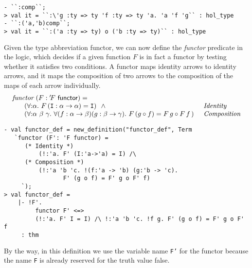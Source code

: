 \begin{session}
\begin{verbatim}
- ``:comp``;
> val it = ``:\'g :ty => ty 'f :ty => ty 'a. 'a 'f 'g`` : hol_type
- ``:('a,'b)comp``;
> val it = ``:('a :ty => ty) o ('b :ty => ty)`` : hol_type
\end{verbatim}
\end{session}

Given the type abbreviation {\sf functor}, we can now define the
{\it functor\/} predicate in the logic, which decides if a given function
$F$ is in fact a functor by testing whether it satisfies two conditions.
A functor maps identity arrows to identity arrows,
and it maps the composition of two arrows to the composition of the maps of each arrow
individually.
$$
 \begin{array}[t]{@{\hspace{8mm}}l@{\hspace{5mm}}l}
   \multicolumn{2}{l}
     {\mbox{\it functor}\ (F : {'\!F}\ \textsf{functor}) =} \\
   (\forall{:}\alpha.\ F\, (\mbox{\tt I}:\alpha \rightarrow \alpha) = \mbox{\tt I}) \ \ \wedge
       & \mbox{\it Identity} \\
   (\forall{:}\alpha\ \beta\ \gamma.\
      \forall(f : \alpha \rightarrow \beta) (g : \beta \rightarrow \gamma).\
      F\, (g \circ f) = F\, g \circ F\, f \, )
       & \mbox{\it Composition}
 \end{array}
$$

\begin{session}
\begin{verbatim}
- val functor_def = new_definition("functor_def", Term
   `functor (F': 'F functor) =
      (* Identity *)
          (!:'a. F' (I:'a->'a) = I) /\
      (* Composition *)
          (!:'a 'b 'c. !(f:'a -> 'b) (g:'b -> 'c).
                 F' (g o f) = F' g o F' f)
     `);
> val functor_def =
    |- !F'.
         functor F' <=>
         (!:'a. F' I = I) /\ !:'a 'b 'c. !f g. F' (g o f) = F' g o F' f
     : thm
\end{verbatim}
\end{session}

By the way, in this definition we use the variable name {\tt F'} for the functor
because the name {\tt F} is already reserved for the truth value false.

